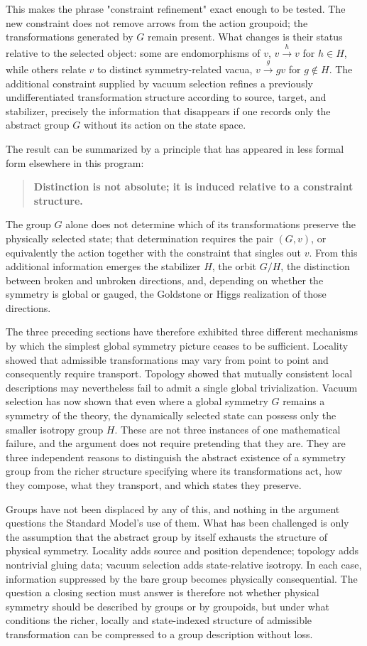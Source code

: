 \documentclass[11pt]{article}
\begin{document}
This makes the phrase "constraint refinement" exact enough to be tested. The new constraint does not remove arrows from the action groupoid; the transformations generated by $G$ remain present. What changes is their status relative to the selected object: some are endomorphisms of $v$, $v \xrightarrow{h} v$ for $h \in H$, while others relate $v$ to distinct symmetry-related vacua, $v \xrightarrow{g} gv$ for $g \notin H$. The additional constraint supplied by vacuum selection refines a previously undifferentiated transformation structure according to source, target, and stabilizer, precisely the information that disappears if one records only the abstract group $G$ without its action on the state space.

The result can be summarized by a principle that has appeared in less formal form elsewhere in this program:
\begin{quote}
\textbf{Distinction is not absolute; it is induced relative to a constraint structure.}
\end{quote}
The group $G$ alone does not determine which of its transformations preserve the physically selected state; that determination requires the pair $(G,v)$, or equivalently the action together with the constraint that singles out $v$. From this additional information emerges the stabilizer $H$, the orbit $G/H$, the distinction between broken and unbroken directions, and, depending on whether the symmetry is global or gauged, the Goldstone or Higgs realization of those directions.

The three preceding sections have therefore exhibited three different mechanisms by which the simplest global symmetry picture ceases to be sufficient. Locality showed that admissible transformations may vary from point to point and consequently require transport. Topology showed that mutually consistent local descriptions may nevertheless fail to admit a single global trivialization. Vacuum selection has now shown that even where a global symmetry $G$ remains a symmetry of the theory, the dynamically selected state can possess only the smaller isotropy group $H$. These are not three instances of one mathematical failure, and the argument does not require pretending that they are. They are three independent reasons to distinguish the abstract existence of a symmetry group from the richer structure specifying where its transformations act, how they compose, what they transport, and which states they preserve.

Groups have not been displaced by any of this, and nothing in the argument questions the Standard Model's use of them. What has been challenged is only the assumption that the abstract group by itself exhausts the structure of physical symmetry. Locality adds source and position dependence; topology adds nontrivial gluing data; vacuum selection adds state-relative isotropy. In each case, information suppressed by the bare group becomes physically consequential. The question a closing section must answer is therefore not whether physical symmetry should be described by groups or by groupoids, but under what conditions the richer, locally and state-indexed structure of admissible transformation can be compressed to a group description without loss.
\end{document}

